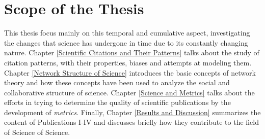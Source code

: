 \section{Scope of the Thesis}
This thesis focus mainly on this temporal and cumulative aspect, investigating the changes that science has undergone in time due to its constantly changing nature.
Chapter \ref{Scientific Citations and Their Patterns} talks about the study of citation patterns, with their properties, biases and attempts at modeling them. Chapter \ref{Network Structure of Science} introduces the basic
concepts of network theory and how these concepts have been used to analyze the social and collaborative structure of science.
Chapter \ref{Science and Metrics} talks about the efforts in trying to determine the quality of scientific publications by the development of \textit{metrics}.
Finally, Chapter \ref{Results and Discussion} summarizes the content of Publications I-IV and discusses briefly how they contribute to the field of Science 
of Science.